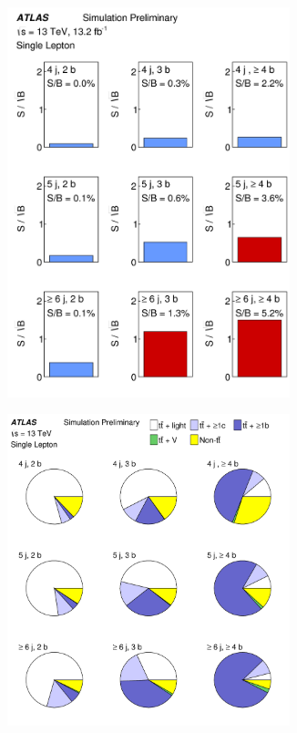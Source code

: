 \begin{figure}[t!]
\begin{subfigure}{0.5\textwidth}
  \centering
  \includegraphics[width=0.9\textwidth]{figures/ttH/fig_03a.png}
  \caption{}
  \label{}
\end{subfigure}
\begin{subfigure}{0.5\textwidth}
  \centering
  \includegraphics[width=0.9\textwidth]{figures/ttH/fig_03b.png}
  \caption{}
  \label{}
\end{subfigure}


\end{figure}
